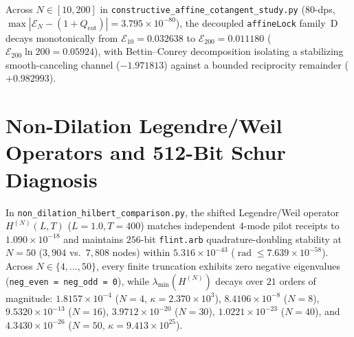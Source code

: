 \documentclass[11pt,a4paper]{article}
\theoremstyle{definition}
\begin{document}
Across $N \in [10, 200]$ in \texttt{constructive\_\allowbreak affine\_\allowbreak cotangent\_\allowbreak study.py} ($80$-dps, $\max|\mathcal{E}_N - (1+Q_{\mathrm{cot}})| = 3.795 \times 10^{-80}$), the decoupled \texttt{affineLock} family~D decays monotonically from $\mathcal{E}_{10} = 0.032638$ to $\mathcal{E}_{200} = 0.011180$ ($\mathcal{E}_{200}\ln 200 = 0.05924$), with Bettin--Conrey decomposition isolating a stabilizing smooth-canceling channel ($-1.971813$) against a bounded reciprocity remainder ($+0.982993$).

\section{Non-Dilation Legendre/Weil Operators and 512-Bit Schur Diagnosis}\label{sec:weil_schur}

In \texttt{non\_\allowbreak dilation\_\allowbreak hilbert\_\allowbreak comparison.py}, the shifted Legendre/Weil operator $H^{(N)}(L, T)$ ($L = 1.0, T = 400$) matches independent $4$-mode pilot receipts to $1.090 \times 10^{-18}$ and maintains $256$-bit \texttt{flint.arb} quadrature-doubling stability at $N = 50$ ($3{,}904$ vs.\ $7{,}808$ nodes) within $5.316 \times 10^{-43}$ ($\operatorname{rad} \le 7.639 \times 10^{-58}$). Across $N \in \{4, \dots, 50\}$, every finite truncation exhibits zero negative eigenvalues (\texttt{neg\_even = neg\_odd = 0}), while $\lambda_{\min}(H^{(N)})$ decays over $21$ orders of magnitude: $1.8157 \times 10^{-4}$ ($N=4$, $\kappa = 2.370 \times 10^3$), $8.4106 \times 10^{-8}$ ($N=8$), $9.5320 \times 10^{-13}$ ($N=16$), $3.9712 \times 10^{-20}$ ($N=30$), $1.0221 \times 10^{-23}$ ($N=40$), and $4.3430 \times 10^{-26}$ ($N=50$, $\kappa = 9.413 \times 10^{25}$).
\end{document}
